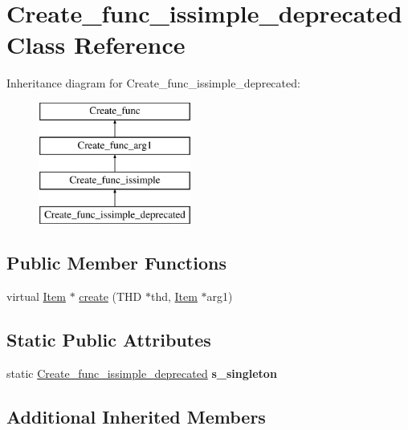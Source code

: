 \hypertarget{classCreate__func__issimple__deprecated}{}\section{Create\+\_\+func\+\_\+issimple\+\_\+deprecated Class Reference}
\label{classCreate__func__issimple__deprecated}
Inheritance diagram for Create\+\_\+func\+\_\+issimple\+\_\+deprecated\+:\begin{figure}[H]
\begin{center}
\leavevmode
\includegraphics[height=4.000000cm]{classCreate__func__issimple__deprecated}
\end{center}
\end{figure}
\subsection*{Public Member Functions}
\begin{DoxyCompactItemize}
\item 
virtual \mbox{\hyperlink{classItem}{Item}} $\ast$ \mbox{\hyperlink{classCreate__func__issimple__deprecated_a58df8393700d5dfea4493b0568fa94f6}{create}} (T\+HD $\ast$thd, \mbox{\hyperlink{classItem}{Item}} $\ast$arg1)
\end{DoxyCompactItemize}
\subsection*{Static Public Attributes}
\begin{DoxyCompactItemize}
\item 
\mbox{\label{classCreate__func__issimple__deprecated_a8f10d4ce2475e0fe0561e51e29fca533}} 
static \mbox{\hyperlink{classCreate__func__issimple__deprecated}{Create\+\_\+func\+\_\+issimple\+\_\+deprecated}} {\bfseries s\+\_\+singleton}
\end{DoxyCompactItemize}
\subsection*{Additional Inherited Members}


